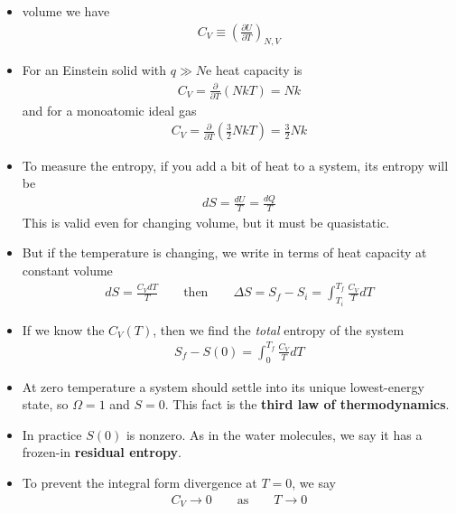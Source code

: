 \documentclass{book}
\begin{document}
\begin{itemize}
	\item	volume we have
	      \begin{align}
		      C_V \equiv \left( \frac{\partial U}{\partial T} \right)_{N,V}
	      \end{align}
	\item For an Einstein solid with $ q \gg N $e heat capacity is
	      \begin{align}
		      C_V = \frac{\partial }{\partial T} (NkT)  = Nk
	      \end{align}
	      and for a monoatomic ideal gas
	      \begin{align}
		      C_V = \frac{\partial }{\partial T} \left( \frac{3}{2} NkT \right) = \frac{3}{2} Nk
	      \end{align}

	\item To measure the entropy, if you add a bit of heat to a system, its entropy will be
	      \begin{align}
		      dS = \frac{dU}{T} = \frac{dQ}{T}
	      \end{align}
	      This is valid even for changing volume, but it must be quasistatic.
	\item But if the temperature is changing, we write in terms of heat capacity at constant volume
	      \begin{align}
		      dS = \frac{C_V dT}{T} \qquad \text{then} \qquad
		      \Delta{S} = S_f - S_i = \int_{T_i}^{T_f} \frac{C_{V}}{T} dT
	      \end{align}
	\item If we know the $C_{V}(T)$, then we find the \textit{total} entropy of the system
	      \begin{align}
		      S_f - S(0) = \int_{0}^{T_f} \frac{C_V}{T} dT
	      \end{align}
	\item At zero temperature a system should settle into its unique lowest-energy state,
	      so $ \Omega=1 $ and $ S=0 $. This fact is the \textbf{third law of thermodynamics}.
	\item In practice $ S(0) $ is nonzero. As in the water molecules, we say it has a frozen-in \textbf{residual entropy}.
	\item To prevent the integral form divergence at $ T=0 $, we say
	      \begin{align}
		      C_{V} \to 0 \qquad \text{as} \qquad T \to 0
	      \end{align}
\end{itemize}
\end{document}
